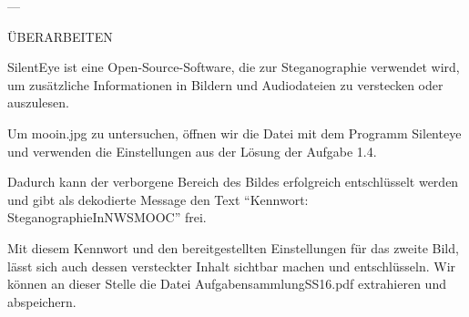 \documentclass{article}
\begin{document}
---

ÜBERARBEITEN

SilentEye ist eine Open-Source-Software, die zur Steganographie verwendet wird, um 
zusätzliche Informationen in Bildern und Audiodateien zu verstecken oder auszulesen. 

Um mooin.jpg zu untersuchen, öffnen wir die Datei mit dem Programm Silenteye und 
verwenden die Einstellungen aus der Lösung der Aufgabe 1.4.

Dadurch kann der verborgene Bereich des Bildes erfolgreich entschlüsselt werden und 
gibt als dekodierte Message den Text ``Kennwort: SteganographieInNWSMOOC'' frei.

Mit diesem Kennwort und den bereitgestellten Einstellungen für das zweite Bild, lässt 
sich auch dessen versteckter Inhalt sichtbar machen und entschlüsseln. Wir können an 
dieser Stelle die Datei AufgabensammlungSS16.pdf extrahieren und abspeichern.
\end{document}
